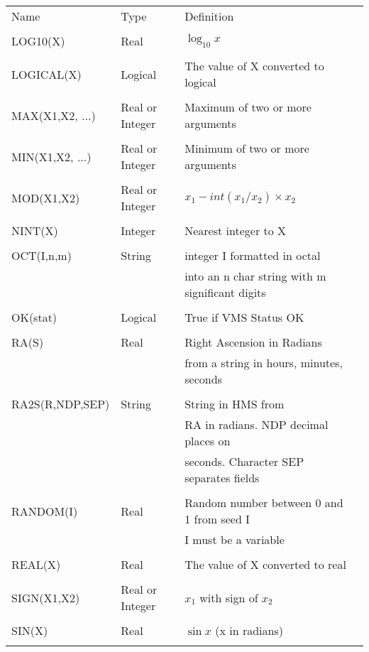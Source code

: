 \documentclass[twoside,11pt,nolof,chapters]{starlink}
\begin{document}
\newpage
\begin{center}
\begin{tabular}{llll}
Name & Type & Definition \\
\\
LOG10(X) & Real & $\log_{10} x $\\
\\
LOGICAL(X) & Logical & The value of X converted to logical \\
\\
MAX(X1,X2, ...) & Real or Integer & Maximum of two or more arguments \\
\\
MIN(X1,X2, ...) & Real or Integer & Minimum of two or more arguments \\
\\
MOD(X1,X2) & Real or Integer & $x_{1} - int(x_{1}/x_{2}) \times x_{2}$ \\
\\
NINT(X) & Integer & Nearest integer to X \\
\\
OCT(I,n,m) & String & integer I formatted in octal \\
 & & into an n char string with m significant digits \\
\\
OK(stat) & Logical & True if VMS Status OK \\
\\
RA(S) & Real & Right Ascension in Radians \\
  & & from a string in hours, minutes, seconds \\
\\
RA2S(R,NDP,SEP) & String & String in HMS from \\
  & & RA in radians. NDP decimal places on \\
  & & seconds. Character SEP separates fields \\
\\
RANDOM(I) & Real & Random number between 0 and 1 from seed I \\
     & &  I must be a variable \\
\\
REAL(X) & Real & The value of X converted to real\\
\\
SIGN(X1,X2) & Real or Integer & $x_{1}$ with sign of $x_{2}$ \\
\\
SIN(X) & Real & $\sin x$ (x in radians) \\
\\

\end{tabular}
\end{center}
\end{document}
